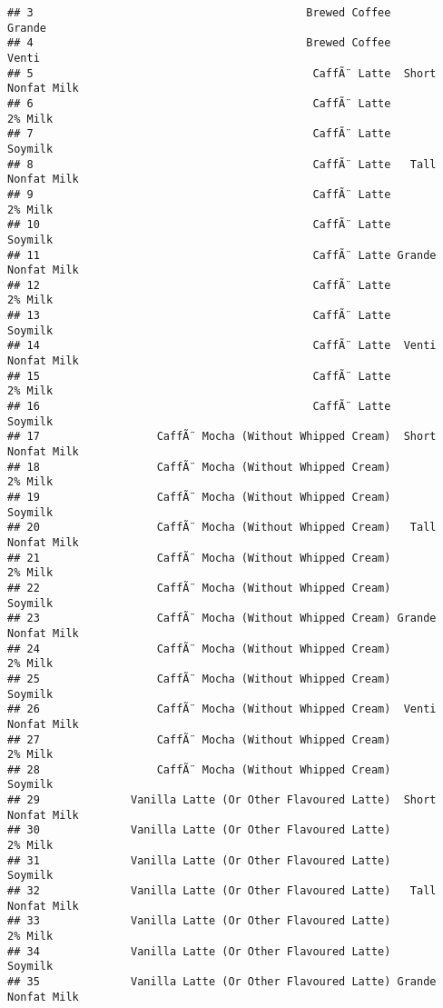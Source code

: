 \documentclass[
]{article}
\begin{document}
\begin{verbatim}
## 3                                          Brewed Coffee             Grande
## 4                                          Brewed Coffee              Venti
## 5                                           CaffÃ¨ Latte  Short Nonfat Milk
## 6                                           CaffÃ¨ Latte            2% Milk
## 7                                           CaffÃ¨ Latte            Soymilk
## 8                                           CaffÃ¨ Latte   Tall Nonfat Milk
## 9                                           CaffÃ¨ Latte            2% Milk
## 10                                          CaffÃ¨ Latte            Soymilk
## 11                                          CaffÃ¨ Latte Grande Nonfat Milk
## 12                                          CaffÃ¨ Latte            2% Milk
## 13                                          CaffÃ¨ Latte            Soymilk
## 14                                          CaffÃ¨ Latte  Venti Nonfat Milk
## 15                                          CaffÃ¨ Latte            2% Milk
## 16                                          CaffÃ¨ Latte            Soymilk
## 17                  CaffÃ¨ Mocha (Without Whipped Cream)  Short Nonfat Milk
## 18                  CaffÃ¨ Mocha (Without Whipped Cream)            2% Milk
## 19                  CaffÃ¨ Mocha (Without Whipped Cream)            Soymilk
## 20                  CaffÃ¨ Mocha (Without Whipped Cream)   Tall Nonfat Milk
## 21                  CaffÃ¨ Mocha (Without Whipped Cream)            2% Milk
## 22                  CaffÃ¨ Mocha (Without Whipped Cream)            Soymilk
## 23                  CaffÃ¨ Mocha (Without Whipped Cream) Grande Nonfat Milk
## 24                  CaffÃ¨ Mocha (Without Whipped Cream)            2% Milk
## 25                  CaffÃ¨ Mocha (Without Whipped Cream)            Soymilk
## 26                  CaffÃ¨ Mocha (Without Whipped Cream)  Venti Nonfat Milk
## 27                  CaffÃ¨ Mocha (Without Whipped Cream)            2% Milk
## 28                  CaffÃ¨ Mocha (Without Whipped Cream)            Soymilk
## 29              Vanilla Latte (Or Other Flavoured Latte)  Short Nonfat Milk
## 30              Vanilla Latte (Or Other Flavoured Latte)            2% Milk
## 31              Vanilla Latte (Or Other Flavoured Latte)            Soymilk
## 32              Vanilla Latte (Or Other Flavoured Latte)   Tall Nonfat Milk
## 33              Vanilla Latte (Or Other Flavoured Latte)            2% Milk
## 34              Vanilla Latte (Or Other Flavoured Latte)            Soymilk
## 35              Vanilla Latte (Or Other Flavoured Latte) Grande Nonfat Milk

\end{verbatim}
\end{document}
